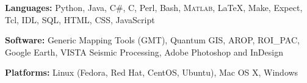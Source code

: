 

\textbf{Languages:} Python, Java, C\#, C, Perl, Bash, \textsc{Matlab}, \LaTeX, Make, Expect, Tcl, IDL, SQL, HTML, CSS, JavaScript

\vspace{5pt}

\textbf{Software:} Generic Mapping Tools (GMT), Quantum GIS, AROP, ROI\_PAC, Google Earth, VISTA Seismic Processing, Adobe Photoshop and InDesign

\vspace{5pt}

\textbf{Platforms:} Linux (Fedora, Red Hat, CentOS, Ubuntu), Mac OS X, Windows
